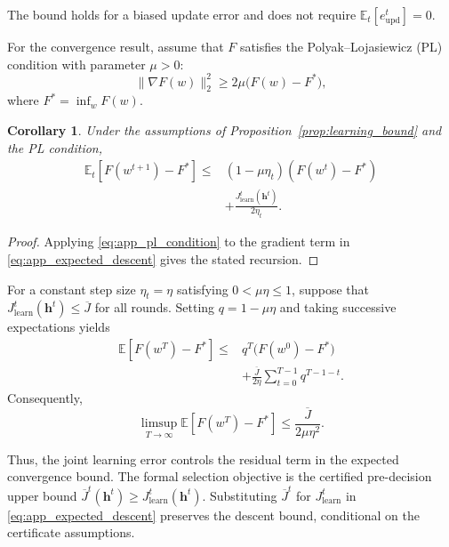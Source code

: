 \documentclass[5p,times]{elsarticle}
\theoremstyle{plain}
\newtheorem{corollary}[theorem]{Corollary}
\theoremstyle{definition}
\theoremstyle{remark}
\begin{document}
The bound holds for a biased update
error and does not require
\(\mathbb E_t[e_{\mathrm{upd}}^t]=0\).

For the convergence result, assume
that \(F\) satisfies the
Polyak--Lojasiewicz (PL) condition
with parameter \(\mu>0\):
\begin{equation}
\|\nabla F(w)\|_2^2
\ge
2\mu\bigl(F(w)-F^*\bigr),
\label{eq:app_pl_condition}
\end{equation}
where \(F^*=\inf_w F(w)\).

\begin{corollary}
\label{cor:joint_pl_convergence}
Under the assumptions of
Proposition~\ref{prop:learning_bound}
and the PL condition,
\begin{equation}
\begin{aligned}
\mathbb E_t
[F(w^{t+1})-F^*]
\le {}&
(1-\mu\eta_t)
(F(w^t)-F^*)\\
&+
\frac{
J_{\mathrm{learn}}^t(\mathbf h^t)
}{2\eta_t}.
\end{aligned}
\label{eq:app_pl_recursion}
\end{equation}
\end{corollary}

\begin{proof}
Applying \eqref{eq:app_pl_condition}
to the gradient term in
\eqref{eq:app_expected_descent}
gives the stated recursion.
\end{proof}

For a constant step size
\(\eta_t=\eta\) satisfying
\(0<\mu\eta\le 1\), suppose that
\(J_{\mathrm{learn}}^t(\mathbf h^t)
\le\overline J\)
for all rounds. Setting
\(q=1-\mu\eta\) and taking
successive expectations yields
\begin{equation}
\begin{aligned}
\mathbb E[F(w^T)-F^*]
\le {}&
q^T\bigl(F(w^0)-F^*\bigr)\\
&+
\frac{\overline J}{2\eta}
\sum_{t=0}^{T-1}q^{T-1-t}.
\end{aligned}
\label{eq:app_pl_multiround}
\end{equation}
Consequently,
\begin{equation}
\limsup_{T\to\infty}
\mathbb E[F(w^T)-F^*]
\le
\frac{\overline J}{2\mu\eta^2}.
\label{eq:app_pl_error_floor}
\end{equation}

Thus, the joint learning error
controls the residual term in the
expected convergence bound.
The formal selection objective is the certified
pre-decision upper bound
\(\overline J^t(\mathbf h^t)\ge
J_{\mathrm{learn}}^t(\mathbf h^t)\).
Substituting \(\overline J^t\) for
\(J_{\mathrm{learn}}^t\) in
\eqref{eq:app_expected_descent} preserves the descent
bound, conditional on the certificate assumptions.
\end{document}
